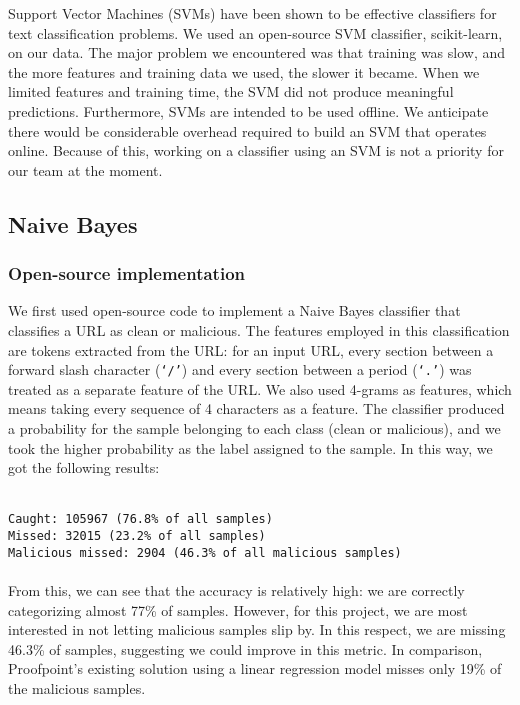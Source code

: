 \documentclass[cs,midyearupdate]{hmcclinic}
\begin{document}
Support Vector Machines (SVMs) have been shown to be effective classifiers for text classification problems. We used an open-source SVM classifier, scikit-learn, on our data. The major problem we encountered was that training was slow, and the more features and training data we used, the slower it became. When we limited features and training time, the SVM did not produce meaningful predictions. Furthermore, SVMs are intended to be used offline. We anticipate there would be considerable overhead required to build an SVM that operates online. Because of this, working on a classifier using an SVM is not a priority for our team at the moment.

\subsection{Naive Bayes}

\subsubsection{Open-source implementation}

We first used open-source code to implement a Naive Bayes classifier that classifies a URL as clean or malicious. The features employed in this classification are tokens extracted from the URL: for an input URL, every section between a forward slash character (\texttt{`/'}) and every section between a period (\texttt{`.'}) was treated as a separate feature of the URL. We also used 4-grams as features, which means taking every sequence of 4 characters as a feature. The classifier produced a probability for the sample belonging to each class (clean or malicious), and we took the higher probability as the label assigned to the sample. In this way, we got the following results:

\texttt{\\
Caught: 105967 (76.8\% of all samples) \\
Missed: 32015 (23.2\% of all samples) \\
Malicious missed: 2904 (46.3\% of all malicious samples)}
\\\\
From this, we can see that the accuracy is relatively high: we are correctly categorizing almost 77\% of samples. However, for this project, we are most interested in not letting malicious samples slip by. In this respect, we are missing 46.3\% of samples, suggesting we could improve in this metric. In comparison, Proofpoint's existing solution using a linear regression model misses only 19\% of the malicious samples.
\end{document}
